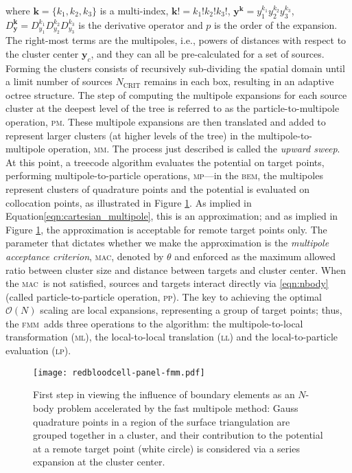 \documentclass[smallcondensed,final]{svjour3}
\newcommand{\bem}{\textsc{bem}\xspace}
\newcommand{\fmm}{\textsc{fmm}\xspace}
\newcommand{\bigO}{\mathcal{O}}
\newcommand{\ptom}{\textsc{p}\texttwooldstyle\textsc{m}\xspace} %
\newcommand{\ltop}{\textsc{l}\texttwooldstyle\textsc{p}\xspace} %
\newcommand{\mtop}{\textsc{m}\texttwooldstyle\textsc{p}\xspace} %
\newcommand{\mtom}{\textsc{m}\texttwooldstyle\textsc{m}\xspace} %
\newcommand{\mtol}{\textsc{m}\texttwooldstyle\textsc{l}\xspace} %
\newcommand{\ltol}{\textsc{l}\texttwooldstyle\textsc{l}\xspace} %
\newcommand{\ptop}{\textsc{p}\texttwooldstyle\textsc{p}\xspace} %
\newcommand{\ncrit}{N_{\text{CRIT}}}
\newcommand{\mac}{\textsc{mac}}
\newcommand{\vect}[1]{\mathbf{#1}}
\begin{document}
\noindent where $\vect{k}=\{k_1, k_2, k_3\}$ is a multi-index, $\vect{k}! = k_1!k_2!k_3!$, $\vect{y}^{\vect{k}} = y_1^{k_1}y_2^{k_2}y_3^{k_3}$, $D_{\vect{y}}^{\vect{k}} = D^{k_1}_{y_1}D^{k_2}_{y_2}D^{k_3}_{y_3}$ is the derivative operator and $p$ is the order of the expansion. The right-most terms are the multipoles, i.e., powers of distances with respect to the cluster center $\vect{y}_c$, and they can all be pre-calculated for a set of sources. Forming the clusters consists of recursively sub-dividing the spatial domain until a limit number of sources $\ncrit$ remains in each box, resulting in an adaptive octree structure. 
The step of computing the multipole expansions for each source cluster at the deepest level of the tree is referred to as the particle-to-multipole operation, {\ptom}. These multipole expansions are then translated and added to represent larger clusters (at higher levels of the tree) in the multipole-to-multipole operation, {\mtom}. The process just described is called the \emph{upward sweep}.
At this point, a treecode algorithm evaluates the potential on target points, performing  multipole-to-particle operations, {\mtop}---in the \bem, the multipoles represent clusters of quadrature points and the potential is evaluated on collocation points, as illustrated in Figure \ref{fig:rbc_fmmbox}. As implied in Equation\eqref{eqn:cartesian_multipole}, this is an approximation; and as implied in Figure \ref{fig:rbc_fmmbox}, the approximation is acceptable for remote target points only. The parameter that dictates whether we make the approximation is the \emph{multipole acceptance criterion}, \mac, denoted by $\theta$ and enforced as the maximum allowed ratio between cluster size and distance between targets and cluster center. When the \mac\ is not satisfied, sources and targets interact directly via \eqref{eqn:nbody} (called particle-to-particle operation, \ptop). The key to achieving the optimal $\bigO(N)$ scaling are local expansions, representing a group of target points; thus, the \fmm\ adds three operations to the algorithm: the multipole-to-local transformation (\mtol), the local-to-local translation (\ltol) and the local-to-particle evaluation (\ltop).

\begin{figure}
\begin{center}
	\texttt{[image: redbloodcell-panel-fmm.pdf]}
	\caption{First step in viewing the influence of boundary elements as an $N$-body problem accelerated by the fast multipole method: Gauss quadrature points in a region of the surface triangulation are grouped together in a cluster, and their contribution to the potential at a remote target point (white circle) is considered via a series expansion at the cluster center.}
	\label{fig:rbc_fmmbox}
\end{center}
\end{figure}
\end{document}
